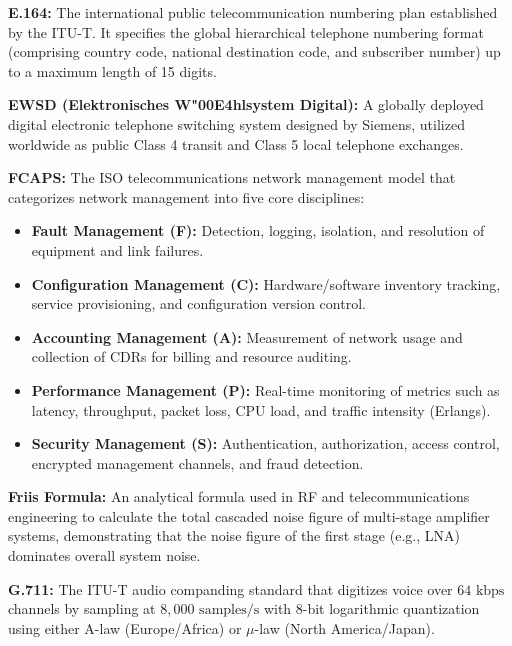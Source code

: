 \documentclass[12pt,a4paper]{report}
\begin{document}
\vspace{0.2cm}
\noindent\textbf{E.164:} The international public telecommunication numbering plan established by the ITU-T. It specifies the global hierarchical telephone numbering format (comprising country code, national destination code, and subscriber number) up to a maximum length of 15 digits.

\vspace{0.2cm}
\noindent\textbf{EWSD (Elektronisches W\char"00E4hlsystem Digital):} A globally deployed digital electronic telephone switching system designed by Siemens, utilized worldwide as public Class 4 transit and Class 5 local telephone exchanges.

\vspace{0.2cm}
\noindent\textbf{FCAPS:} The ISO telecommunications network management model that categorizes network management into five core disciplines:
\begin{itemize}
    \item \textbf{Fault Management (F):} Detection, logging, isolation, and resolution of equipment and link failures.
    \item \textbf{Configuration Management (C):} Hardware/software inventory tracking, service provisioning, and configuration version control.
    \item \textbf{Accounting Management (A):} Measurement of network usage and collection of CDRs for billing and resource auditing.
    \item \textbf{Performance Management (P):} Real-time monitoring of metrics such as latency, throughput, packet loss, CPU load, and traffic intensity (Erlangs).
    \item \textbf{Security Management (S):} Authentication, authorization, access control, encrypted management channels, and fraud detection.
\end{itemize}

\vspace{0.2cm}
\noindent\textbf{Friis Formula:} An analytical formula used in RF and telecommunications engineering to calculate the total cascaded noise figure of multi-stage amplifier systems, demonstrating that the noise figure of the first stage (e.g., LNA) dominates overall system noise.

\vspace{0.2cm}
\noindent\textbf{G.711:} The ITU-T audio companding standard that digitizes voice over $64\text{ kbps}$ channels by sampling at $8,000\text{ samples/s}$ with 8-bit logarithmic quantization using either A-law (Europe/Africa) or $\mu$-law (North America/Japan).
\end{document}
